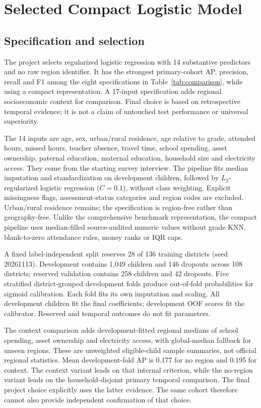 \documentclass[conference,a4paper]{IEEEtran}
\begin{document}
\section{\textbf{Selected Compact Logistic Model}}\label{sec:compact}
\subsection{\textbf{Specification and selection}}
The project selects regularized logistic regression with 14 substantive predictors and no raw region identifier. It has the strongest primary-cohort AP, precision, recall and F1 among the eight specifications in Table~\ref{tab:comparison}, while using a compact representation. A 17-input specification adds regional socioeconomic context for comparison. Final choice is based on retrospective temporal evidence; it is not a claim of untouched test performance or universal superiority.

The 14 inputs are age, sex, urban/rural residence, age relative to grade, attended hours, missed hours, teacher absence, travel time, school spending, asset ownership, paternal education, maternal education, household size and electricity access. They come from the starting survey interview. The pipeline fits median imputation and standardization on development children, followed by $L_2$-regularized logistic regression ($C=0.1$), without class weighting. Explicit missingness flags, assessment-status categories and region codes are excluded. Urban/rural residence remains; the specification is region-free rather than geography-free. Unlike the comprehensive benchmark representation, the compact pipeline uses median-filled source-audited numeric values without grade KNN, blank-to-zero attendance rules, money ranks or IQR caps.

A fixed label-independent split reserves 28 of 136 training districts (seed 20261113). Development contains 1,049 children and 146 dropouts across 108 districts; reserved validation contains 258 children and 42 dropouts. Five stratified district-grouped development folds produce out-of-fold probabilities for sigmoid calibration. Each fold fits its own imputation and scaling. All development children fit the final coefficients; development OOF scores fit the calibrator. Reserved and temporal outcomes do not fit parameters.

The context comparison adds development-fitted regional medians of school spending, asset ownership and electricity access, with global-median fallback for unseen regions. These are unweighted eligible-child sample summaries, not official regional statistics. Mean development-fold AP is 0.177 for no region and 0.195 for context. The context variant leads on that internal criterion, while the no-region variant leads on the household-disjoint primary temporal comparison. The final project choice explicitly uses the latter evidence. The same cohort therefore cannot also provide independent confirmation of that choice.
\end{document}
